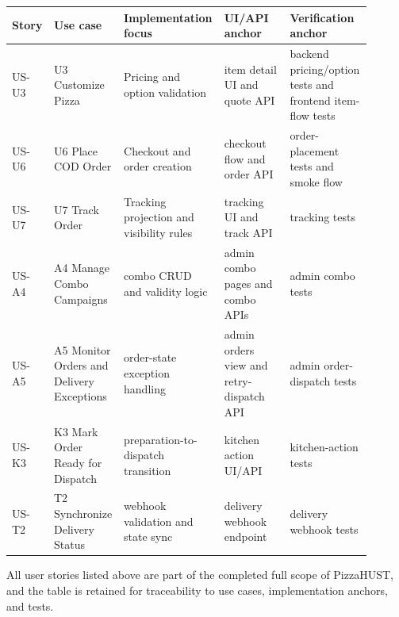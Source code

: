 \begingroup
\footnotesize
\setlength{\LTpre}{0.4em}
\setlength{\LTpost}{0.8em}
\label{tab:story-traceability}
\begin{tabular}{L{0.11\linewidth} L{0.16\linewidth} L{0.23\linewidth} L{0.18\linewidth} L{0.22\linewidth}}
\toprule
\textbf{Story} & \textbf{Use case} & \textbf{Implementation focus} & \textbf{UI/API anchor} & \textbf{Verification anchor} \\
\midrule
US-U3 & U3 Customize Pizza & Pricing and option validation & item detail UI and quote API & backend pricing/option tests and frontend item-flow tests \\
US-U6 & U6 Place COD Order & Checkout and order creation & checkout flow and order API & order-placement tests and smoke flow \\
US-U7 & U7 Track Order & Tracking projection and visibility rules & tracking UI and track API & tracking tests \\
US-A4 & A4 Manage Combo Campaigns & combo CRUD and validity logic & admin combo pages and combo APIs & admin combo tests \\
US-A5 & A5 Monitor Orders and Delivery Exceptions & order-state exception handling & admin orders view and retry-dispatch API & admin order-dispatch tests \\
US-K3 & K3 Mark Order Ready for Dispatch & preparation-to-dispatch transition & kitchen action UI/API & kitchen-action tests \\
US-T2 & T2 Synchronize Delivery Status & webhook validation and state sync & delivery webhook endpoint & delivery webhook tests \\
\bottomrule
\end{tabular}
\endgroup

All user stories listed above are part of the completed full scope of PizzaHUST, and the table is retained for traceability to use cases, implementation anchors, and tests.

